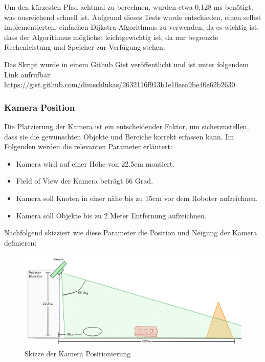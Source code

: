 Um den kürzesten Pfad achtmal zu berechnen, wurden etwa 0,128 ms benötigt, was ausreichend schnell ist. Aufgrund dieses Tests wurde entschieden, einen selbst implementierten, einfachen Dijkstra-Algorithmus zu verwenden, da es wichtig ist, dass der Algorithmus möglichst leichtgewichtig ist, da nur begrenzte Rechenleistung und Speicher zur Verfügung stehen.

Das Skript wurde in einem Github Gist veröffentlicht und ist unter folgendem Link aufrufbar: \url{https://gist.github.com/dimschlukas/2632116f913b1e10eea9be40e62b2630}

\subsubsection{Kamera Position}\label{camera-position}

Die Platzierung der Kamera ist ein entscheidender Faktor, um sicherzustellen, dass sie die gewünschten Objekte und Bereiche korrekt erfassen kann. Im Folgenden werden die relevanten Parameter erläutert:

\begin{itemize}
    \item Kamera wird auf einer Höhe von 22.5cm montiert.
    \item Field of View der Kamera beträgt 66 Grad.
    \item Kamera soll Knoten in einer nähe bis zu 15cm vor dem Roboter aufzeichnen.
    \item Kamera soll Objekte bis zu 2 Meter Entfernung aufzeichnen.
\end{itemize}

Nachfolgend skizziert wie diese Parameter die Position und Neigung der Kamera definieren:

\begin{figure}[H]
    \centering
    \includegraphics[width=1\linewidth]{assets/informatik-prototyp/camera/camera_position.png}
    \caption{Skizze der Kamera Positionierung}
    \label{fig:camera-position}
\end{figure}

